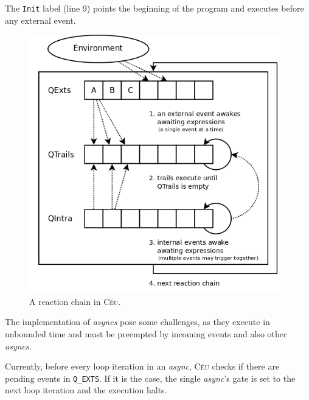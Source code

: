 \documentclass{sig-alternate-ipsn09}
\newcommand{\2}{\;\;}
\newcommand{\5}{\;\;\;\;\;}
\newcommand{\CEU}{\textsc{C\'{e}u}}
\newcommand{\code}[1] {{\small{\texttt{#1}}}}
\begin{document}
The \code{Init} label (line 9) points the beginning of the program and executes 
before any external event.

\begin{figure}[ht]
\centering
\caption{ A reaction chain in \CEU. }
\label{fig:queues}
\includegraphics[scale=0.32]{queues.png}
\end{figure}

The implementation of \emph{asyncs} pose some challenges, as they execute in 
unbounded time and must be preempted by incoming events and also other 
\emph{asyncs}.

Currently, before every loop iteration in an \emph{async}, \CEU{} checks if 
there are pending events in \code{Q\_EXTS}.
If it is the case, the single \emph{async}'s gate is set to the next loop 
iteration and the execution halts.

\end{document}

